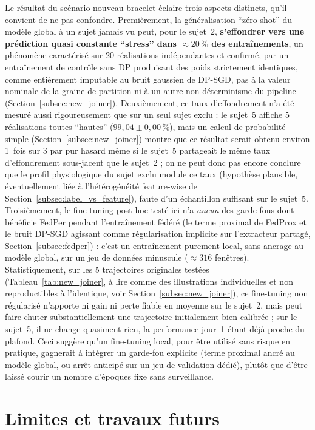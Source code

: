 \documentclass{acmart}
\begin{document}
Le résultat du scénario nouveau bracelet éclaire trois aspects distincts,
qu'il convient de ne pas confondre. Premièrement, la généralisation
``zéro-shot'' du modèle global à un sujet jamais vu peut, pour le sujet~2,
\textbf{s'effondrer vers une prédiction quasi constante ``stress'' dans
$\approx 20\,\%$ des entraînements}, un phénomène caractérisé sur 20
réalisations indépendantes et confirmé, par un entraînement de contrôle
sans DP produisant des poids strictement identiques, comme entièrement
imputable au bruit gaussien de DP-SGD, pas à la valeur nominale de la
graine de partition ni à un autre non-déterminisme du pipeline
(Section~\ref{subsec:new_joiner}). Deuxièmement, ce taux d'effondrement
n'a été mesuré aussi rigoureusement que sur un seul sujet exclu : le
sujet~5 affiche 5 réalisations toutes ``hautes'' ($99{,}04 \pm
0{,}00\,\%$), mais un calcul de probabilité simple
(Section~\ref{subsec:new_joiner}) montre que ce résultat serait obtenu
environ 1~fois sur 3 par pur hasard même si le sujet~5 partageait le même
taux d'effondrement sous-jacent que le sujet~2 ; on ne peut donc pas encore
conclure que le profil physiologique du sujet exclu module ce taux
(hypothèse plausible, éventuellement liée à l'hétérogénéité feature-wise de
Section~\ref{subsec:label_vs_feature}), faute d'un échantillon
suffisant sur le sujet~5. Troisièmement, le fine-tuning post-hoc testé ici
n'a \emph{aucun} des garde-fous dont bénéficie FedPer pendant
l'entraînement fédéré (le terme proximal de FedProx et le bruit DP-SGD
agissant comme régularisation implicite sur l'extracteur partagé,
Section~\ref{subsec:fedper}) : c'est un entraînement purement local, sans
ancrage au modèle global, sur un jeu de données minuscule ($\approx 316$
fenêtres). Statistiquement, sur les 5 trajectoires originales testées
(Tableau~\ref{tab:new_joiner}, à lire comme des illustrations individuelles
et non reproductibles à l'identique, voir Section~\ref{subsec:new_joiner}),
ce fine-tuning non régularisé n'apporte ni gain ni perte fiable en moyenne
sur le sujet~2, mais peut faire chuter
substantiellement une trajectoire initialement bien calibrée ; sur le
sujet~5, il ne change quasiment rien, la performance jour~1 étant déjà
proche du plafond. Ceci suggère qu'un fine-tuning local, pour être utilisé
sans risque en pratique, gagnerait à intégrer un garde-fou explicite (terme
proximal ancré au modèle global, ou arrêt anticipé sur un jeu de validation
dédié), plutôt que d'être laissé courir un nombre d'époques fixe sans
surveillance.

\section{Limites et travaux futurs}
\label{sec:limits}
\end{document}

